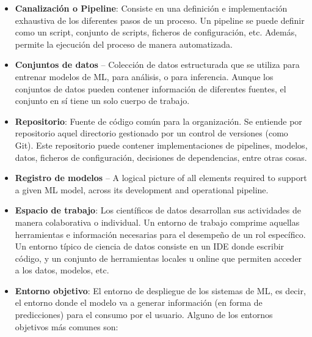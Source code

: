 \documentclass[
  12pt,
  a4paperpaper,
]{report}
\begin{document}
\begin{itemize}
\item
  \textbf{Canalización o Pipeline}: Consiste en una definición e
  implementación exhaustiva de los diferentes pasos de un proceso. Un
  pipeline se puede definir como un script, conjunto de scripts,
  ficheros de configuración, etc. Además, permite la ejecución del
  proceso de manera automatizada.
\item
  \textbf{Conjuntos de datos} -- Colección de datos estructurada que se
  utiliza para entrenar modelos de ML, para análisis, o para inferencia.
  Aunque los conjuntos de datos pueden contener información de
  diferentes fuentes, el conjunto en sí tiene un solo cuerpo de trabajo.
\item
  \textbf{Repositorio}: Fuente de código común para la organización. Se
  entiende por repositorio aquel directorio gestionado por un control de
  versiones (como Git). Este repositorio puede contener implementaciones
  de pipelines, modelos, datos, ficheros de configuración, decisiones de
  dependencias, entre otras cosas.
\item
  \textbf{Registro de modelos} -- A logical picture of all elements
  required to support a given ML model, across its development and
  operational pipeline.
\item
  \textbf{Espacio de trabajo}: Los científicos de datos desarrollan sus
  actividades de manera colaborativa o individual. Un entorno de trabajo
  comprime aquellas herramientas e información necesarias para el
  desempeño de un rol específico. Un entorno típico de ciencia de datos
  consiste en un IDE donde escribir código, y un conjunto de
  herramientas locales u online que permiten acceder a los datos,
  modelos, etc.
\item
  \textbf{Entorno objetivo}: El entorno de despliegue de los sistemas de
  ML, es decir, el entorno donde el modelo va a generar información (en
  forma de predicciones) para el consumo por el usuario. Alguno de los
  entornos objetivos más comunes son:


\end{itemize}
\end{document}
